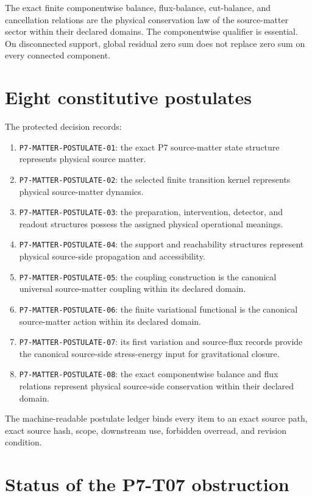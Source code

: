 \documentclass[11pt]{article}
\begin{document}
The exact finite componentwise balance, flux-balance, cut-balance, and
cancellation relations are the physical conservation law of the source-matter
sector within their declared domains.  The componentwise qualifier is
essential.  On disconnected support, global residual zero sum does not replace
zero sum on every connected component.

\section{Eight constitutive postulates}

The protected decision records:
\begin{enumerate}
  \item \texttt{P7-MATTER-POSTULATE-01}: the exact P7 source-matter state
        structure represents physical source matter.
  \item \texttt{P7-MATTER-POSTULATE-02}: the selected finite transition kernel
        represents physical source-matter dynamics.
  \item \texttt{P7-MATTER-POSTULATE-03}: the preparation, intervention,
        detector, and readout structures possess the assigned physical
        operational meanings.
  \item \texttt{P7-MATTER-POSTULATE-04}: the support and reachability
        structures represent physical source-side propagation and
        accessibility.
  \item \texttt{P7-MATTER-POSTULATE-05}: the coupling construction is the
        canonical universal source-matter coupling within its declared domain.
  \item \texttt{P7-MATTER-POSTULATE-06}: the finite variational functional is
        the canonical source-matter action within its declared domain.
  \item \texttt{P7-MATTER-POSTULATE-07}: its first variation and source-flux
        records provide the canonical source-side stress-energy input for
        gravitational closure.
  \item \texttt{P7-MATTER-POSTULATE-08}: the exact componentwise balance and
        flux relations represent physical source-side conservation within
        their declared domain.
\end{enumerate}

The machine-readable postulate ledger binds every item to an exact source
path, exact source hash, scope, downstream use, forbidden overread, and
revision condition.

\section{Status of the P7-T07 obstruction}
\end{document}
